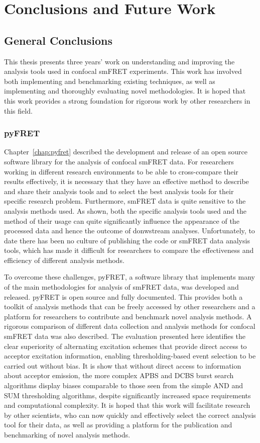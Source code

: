 \chapter{Conclusions and Future Work}
\label{chap:conclusions}

\section{General Conclusions}
This thesis presents three years' work on understanding and improving the analysis tools used in confocal smFRET experiments. This work has involved both implementing and benchmarking existing techniques, as well as implementing and thoroughly evaluating novel methodologies. It is hoped that this work provides a strong foundation for rigorous work by other researchers in this field.

\subsection{pyFRET}
Chapter~\ref{chap:pyfret} described the development and release of an open source software library for the analysis of confocal smFRET data. For researchers working in different research environments to be able to cross-compare their results effectively, it is necessary that they have an effective method to describe and share their analysis tools and to select the best analysis tools for their specific research problem. Furthermore, smFRET data is quite sensitive to the analysis methods used.  As shown, both the specific analysis tools used and the method of their usage can quite significantly influence the appearance of the processed data and hence the outcome of donwstream analyses. Unfortunately, to date there has been no culture of publishing the code or smFRET data analysis tools, which has made it difficult for researchers to compare the effectiveness and efficiency of different analysis methods.

To overcome these challenges, pyFRET, a software library that implements many of the main methodologies for analysis of smFRET data, was developed and released. pyFRET is open source and fully documented. This provides both a toolkit of analysis methods that can be freely accessed by other researchers and a platform for researchers to contribute and benchmark novel analysis methods. A rigorous comparison of different data collection and analysis methods for confocal smFRET data was also described. The evaluation presented here identifies the clear superiority of alternating excitation schemes that provide direct access to acceptor excitation information, enabling thresholding-based event selection to be carried out without bias. It is show that without direct access to information about acceptor emission, the more complex APBS and DCBS burst search algorithms display biases comparable to those seen from the simple AND and SUM thresholding algorithms, despite significantly increased space requirements and computational complexity. It is hoped that this work will facilitate research by other scientists, who can now quickly and effectively select the correct analysis tool for their data, as well as providing a platform for the publication and benchmarking of novel analysis methods.

